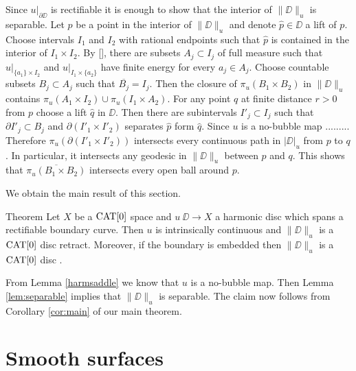 \documentclass[a4paper,10pt]{amsart}
\begin{document}
Since $u|_{\partial \DD}$ is rectifiable it is enough to show that 
the interior of $\|\DD\|_u$ is separable. Let $p$ be a point in the interior of $\|\DD\|_u$ and denote $\hat p\in\DD$ 
a lift of $p$. Choose intervals $I_1$ and $I_2$ with rational endpoints such that $\hat p$ is contained in the interior of $I_1\times I_2$.
By \ref{}, there are subsets $A_j\subset I_j$ of full measure such that $u|_{\{a_1\}\times I_2}$
and $u|_{I_1\times \{a_2\}}$ have finite energy for every $a_j\in A_j$. Choose countable subsets $B_j\subset A_j$
such that $\overline{B_j}=I_j$. Then the closure of $\pi_u(B_1\times B_2)$ in $\|\DD\|_u$ contains 
$\pi_u(A_1\times I_2)\cup \pi_u(I_1\times A_2)$.
For any point $q$ at finite distance $r>0$ from $p$ choose a lift $\hat q$ in $\DD$. Then there are subintervals $I'_j\subset I_j$
such that $\partial I'_j\subset B_j$ and $\partial( I'_1\times I'_2)$ separates $\hat p$ form $\hat q$.
Since $u$ is a no-bubble map .........
Therefore $\pi_u(\partial( I'_1\times I'_2))$ intersects every continuous path in $|\DD|_u$ from $p$ to $q$. In particular, it intersects
any geodesic in $\|\DD\|_u$ between $p$ and $q$. This shows that $\overline{\pi_u(B_1\times B_2)}$ intersects every open ball around $p$.
\qeds





We obtain the main result of this section.


\begin{thm}{Theorem}\label{thm:harmonic}
Let $X$ be a $\mathop{\rm CAT}\nolimits[0]$ space 
and $u\:\DD\to X$ a harmonic disc which spans a rectifiable boundary curve. 
Then $u$ is intrinsically continuous and $\|\DD\|_u$ is a $\mathop{\rm CAT}\nolimits[0]$ disc retract. 
Moreover, if the boundary is embedded then $\|\DD\|_u$ is a $\mathop{\rm CAT}\nolimits[0]$ disc .
\end{thm}

From Lemma \ref{harmsaddle} we know that $u$ is a no-bubble map. Then Lemma \ref{lem:separable} implies that 
$\|\DD\|_u$ is separable. The claim now follows from Corollary \ref{cor:main} of our main theorem.
\qeds











\section{Smooth surfaces}\label{sec:smooth}
\end{document}
